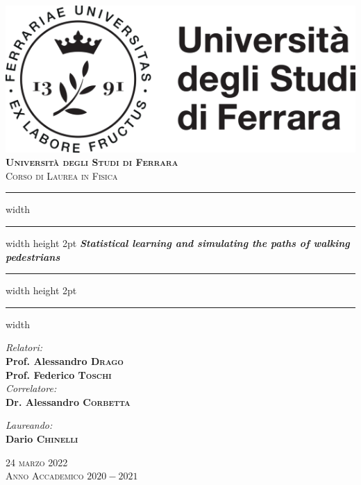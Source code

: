 \documentclass[10pt,a4paper]{report}
\begin{document}
\begin{titlepage}
	\centering
	\vspace*{15mm}
	\includegraphics[]{logo.png}\\
	\vspace*{15mm}
	\huge \textbf{\textsc{Università degli Studi di Ferrara}}\\
	\Large \textsc{Corso di Laurea in Fisica}
	
	\vspace*{1.2cm}
	\hrule width \hsize \kern 1mm \hrule width \hsize height 2pt
	\vspace*{10mm}
	\Huge \emph{\textbf{Statistical learning and simulating the paths of walking pedestrians}}
	\vspace*{10mm}
	\hrule width \hsize height 2pt
	\vspace*{1mm}
	\hrule width \hsize \kern 1mm
	
	\vspace*{12mm}
	\begin{minipage}{0.45\textwidth}
		\begin{flushleft} \Large
			\emph{Relatori:}\\
			\Large \textbf{Prof. Alessandro \textsc{Drago}}\\
			\Large \textbf{Prof. Federico \textsc{Toschi}}\\
			\vspace*{5mm}
			\emph{Correlatore:}\\
			\Large \textbf{Dr. Alessandro \textsc{Corbetta}}
		\end{flushleft}
	\end{minipage}
	\begin{minipage}{0.45\textwidth}
		\begin{flushright} \Large
			\emph{Laureando:} \\
			\Large \textbf{Dario \textsc{Chinelli}}
		\end{flushright}
	\end{minipage}
	
	\vspace*{16mm}
	\Large \textsc{24 marzo 2022}\\
	\vspace*{5mm}
	\Large \textsc{Anno Accademico $2020-2021$}
\end{titlepage}
\restoregeometry
\end{document}
